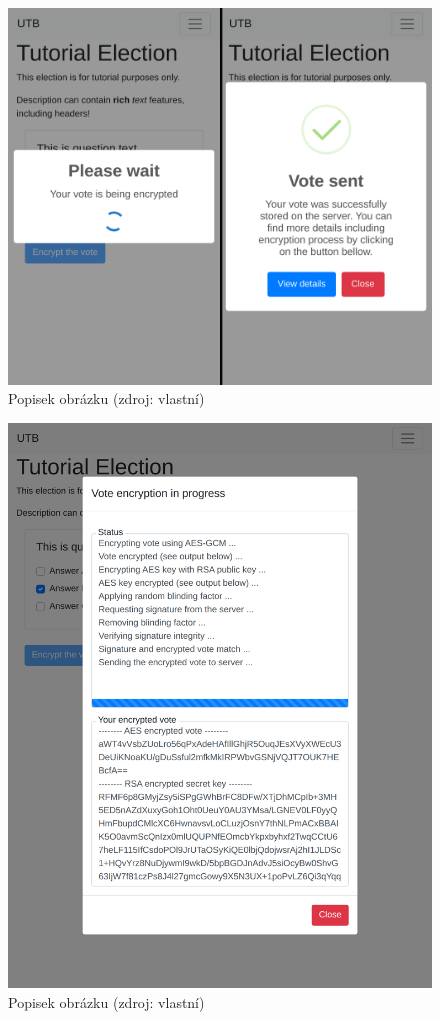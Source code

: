 \begin{figure}[h]
	\centering
	\includegraphics[width=\linewidth]{graphics/attachements/volbyCompared2.png}
	\captionsetup{width=\linewidth}
	\caption*{Popisek obrázku (zdroj: vlastní)}
\end{figure}

\begin{figure}[h]
	\centering
	\includegraphics[width=\linewidth]{graphics/attachements/volbyDetails.png}
	\captionsetup{width=\linewidth}
	\caption*{Popisek obrázku (zdroj: vlastní)}
\end{figure}